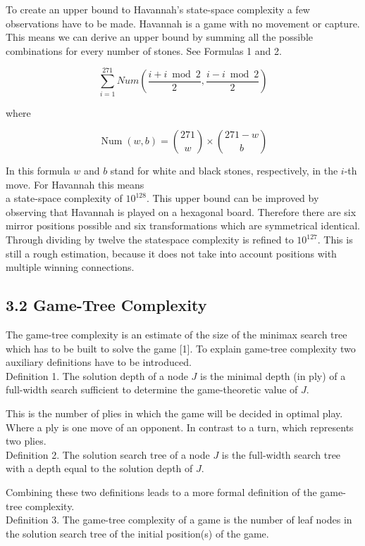 \documentclass[10pt]{article}
\begin{document}
To create an upper bound to Havannah's state-space complexity a few observations have to be made. Havannah is a game with no movement or capture. This means we can derive an upper bound by summing all the possible combinations for every number of stones. See Formulas 1 and 2.


\begin{equation*}
\sum_{i=1}^{271} N u m\left(\frac{i+i \bmod 2}{2}, \frac{i-i \bmod 2}{2}\right) \tag{1}
\end{equation*}


where


\begin{equation*}
\operatorname{Num}(w, b)=\binom{271}{w} \times\binom{ 271-w}{b} \tag{2}
\end{equation*}


In this formula $w$ and $b$ stand for white and black stones, respectively, in the $i$-th move. For Havannah this means\\
a state-space complexity of $10^{128}$. This upper bound can be improved by observing that Havannah is played on a hexagonal board. Therefore there are six mirror positions possible and six transformations which are symmetrical identical. Through dividing by twelve the statespace complexity is refined to $10^{127}$. This is still a rough estimation, because it does not take into account positions with multiple winning connections.

\subsection*{3.2 Game-Tree Complexity}
The game-tree complexity is an estimate of the size of the minimax search tree which has to be built to solve the game [1]. To explain game-tree complexity two auxiliary definitions have to be introduced.\\
Definition 1. The solution depth of a node $J$ is the minimal depth (in ply) of a full-width search sufficient to determine the game-theoretic value of $J$.

This is the number of plies in which the game will be decided in optimal play. Where a ply is one move of an opponent. In contrast to a turn, which represents two plies.\\
Definition 2. The solution search tree of a node $J$ is the full-width search tree with a depth equal to the solution depth of $J$.

Combining these two definitions leads to a more formal definition of the game-tree complexity.\\
Definition 3. The game-tree complexity of a game is the number of leaf nodes in the solution search tree of the initial position(s) of the game.
\end{document}
